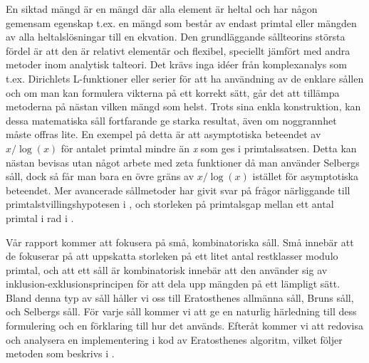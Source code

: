 En siktad mängd är en mängd där alla element är heltal och har någon gemensam egenskap t.ex. en mängd som består av endast primtal eller mängden av alla heltalslösningar till en ekvation. Den grundläggande sållteorins största fördel är att den är relativt elementär och flexibel, speciellt jämfört med andra metoder inom analytisk talteori. Det krävs inga idéer från komplexanalys som t.ex. Dirichlets L-funktioner eller serier för att ha användning av de enklare sållen och om man kan formulera vikterna på ett korrekt sätt, går det att tillämpa metoderna på nästan vilken mängd som helst. Trots sina enkla konstruktion, kan dessa matematiska såll fortfarande ge starka resultat, även om noggrannhet måste offras lite. En exempel på detta är att asymptotiska beteendet av \(x/\log(x)\) för antalet primtal mindre än \textit{x} som ges i primtalssatsen. Detta kan nästan bevisas utan något arbete med zeta funktioner då man använder Selbergs såll, dock så får man bara en övre gräns av \(x/\log(x)\) istället för asymptotiska beteendet. Mer avancerade sållmetoder har givit svar på frågor närliggande till primtalstvillingshypotesen i \cite{chen2Prime}, och storleken på primtalsgap mellan ett antal primtal i rad i \cite{mayBound}.

Vår rapport kommer att fokusera på små, kombinatoriska såll. Små innebär att de fokuserar på att uppskatta storleken på ett litet antal restklasser modulo primtal, och att ett såll är kombinatorisk innebär att den använder sig av inklusion-exklusionsprincipen för att dela upp mängden på ett lämpligt sätt. Bland denna typ av såll håller vi oss till Eratosthenes allmänna såll, Bruns såll, och Selbergs såll. För varje såll kommer vi att ge en naturlig härledning till dess formulering och en förklaring till hur det används. Efteråt kommer vi att redovisa och analysera en implementering i kod av Eratosthenes algoritm, vilket följer metoden som beskrivs i \cite{HaraldSieve}.